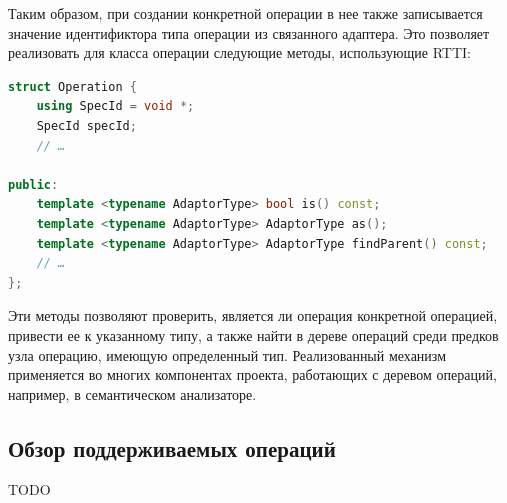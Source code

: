 Таким образом, при создании конкретной операции в нее также записывается значение идентификтора типа операции из связанного адаптера. Это позволяет реализовать для класса операции следующие методы, использующие RTTI:

\begin{lstlisting}[language=C++, caption=Интерфейс для доступа к RTTI]
struct Operation {
    using SpecId = void *;
    SpecId specId;
    // …

public:
    template <typename AdaptorType> bool is() const;
    template <typename AdaptorType> AdaptorType as();
    template <typename AdaptorType> AdaptorType findParent() const;
    // …
};
\end{lstlisting}

Эти методы позволяют проверить, является ли операция конкретной операцией, привести ее к указанному типу, а также найти в дереве операций среди предков узла операцию, имеющую определенный тип. Реализованный механизм применяется во многих компонентах проекта, работающих с деревом операций, например, в семантическом анализаторе.

\subsection{Обзор поддерживаемых операций}

TODO
